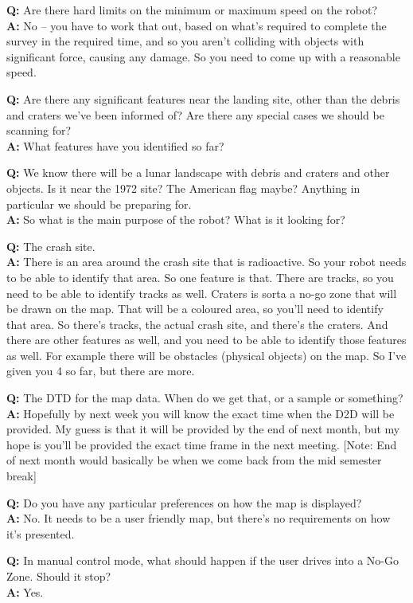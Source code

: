 \documentclass{article}
\newcounter{qcounter}
\begin{document}
\begin{list}{:~}{}
\item \textbf{Q:} Are there hard limits on the minimum or maximum speed on the robot?\\
\textbf{A:} No – you have to work that out, based on what’s required to complete the survey in the required time, and so you aren’t colliding with objects with significant force, causing any damage. So you need to come up with a reasonable speed.\\
\item \textbf{Q:} Are there any significant features near the landing site, other than the debris and craters we’ve been informed of? Are there any special cases we should be scanning for?\\
\textbf{A:} What features have you identified so far?\\
\item \textbf{Q:} We know there will be a lunar landscape with debris and craters and other objects. Is it near the 1972 site? The American flag maybe? Anything in particular we should be preparing for.\\
\textbf{A:} So what is the main purpose of the robot? What is it looking for?\\
\item \textbf{Q:} The crash site.\\
\textbf{A:} There is an area around the crash site that is radioactive. So your robot needs to be able to identify that area. So one feature is that. There are tracks, so you need to be able to identify tracks as well. Craters is sorta a no-go zone that will be drawn on the map. That will be a coloured area, so you’ll need to identify that area. So there’s tracks, the actual crash site, and there’s the craters. And there are other features as well, and you need to be able to identify those features as well. For example there will be obstacles (physical objects) on the map. So I’ve given you 4 so far, but there are more.\\
\item \textbf{Q:} The DTD for the map data. When do we get that, or a sample or something?\\
\textbf{A:} Hopefully by next week you will know the exact time when the D2D will be provided. My guess is that it will be provided by the end of next month, but my hope is you’ll be provided the exact time frame in the next meeting. [Note: End of next month would basically be when we come back from the mid semester break]\\
\item \textbf{Q:} Do you have any particular preferences on how the map is displayed?\\
\textbf{A:} No. It needs to be a user friendly map, but there’s no requirements on how it’s presented.\\
\item \textbf{Q:} In manual control mode, what should happen if the user drives into a No-Go Zone. Should it stop?\\
\textbf{A:} Yes.\\


\end{list}
\end{document}
